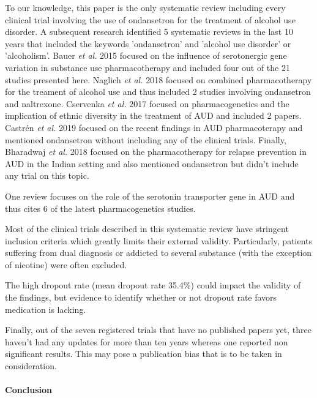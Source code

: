 To our knowledge, this paper is the only systematic review including every clinical trial involving the use of ondansetron for the treatment of alcohol use disorder. A subsequent research identified 5 systematic reviews in the last 10 years that included the keywords 'ondansetron' and 'alcohol use disorder' or 'alcoholism'. Bauer \textit{et al.} 2015 \cite{bauer_serotonergic_2015} focused on the influence of serotonergic gene variation in substance use pharmacotherapy and included four out of the 21 studies presented here. Naglich \textit{et al.} 2018 \cite{naglich_systematic_2018} focused on combined pharmacotherapy for the treament of alcohol use and thus included 2 studies involving ondansetron and naltrexone. Cservenka \textit{et al.} 2017 \cite{cservenka_review_2017} focused on pharmacogenetics and the implication of ethnic diversity in the treatment of AUD and included 2 papers. Castrén \textit{et al.} 2019 \cite{castren_selecting_2019} focused on the recent findings in AUD pharmacoterapy and mentioned ondansetron without including any of the clinical trials. Finally, Bharadwaj \textit{et al.} 2018 \cite{bharadwaj_pharmacotherapy_2018} focused on the pharmacotherapy for relapse prevention in AUD in the Indian setting and also mentioned ondansetron but didn't include any trial on this topic.

One review \cite{thompson_variation_2016} focuses on the role of the serotonin transporter gene in AUD and thus cites 6 of the latest pharmacogenetics studies.

Most of the clinical trials described in this systematic review have stringent inclusion criteria which greatly limits their external validity. Particularly, patients suffering from dual diagnosis or addicted to several substance (with the exception of nicotine) were often excluded. 

The high dropout rate (mean dropout rate 35.4\%) could impact the validity of the findings, but evidence to identify whether or not dropout rate favors medication is lacking.

Finally, out of the seven registered trials that have no published papers yet, three haven't had any updates for more than ten years whereas one reported non significant results. This may pose a publication bias that is to be taken in consideration.

\paragraph{Conclusion} 

